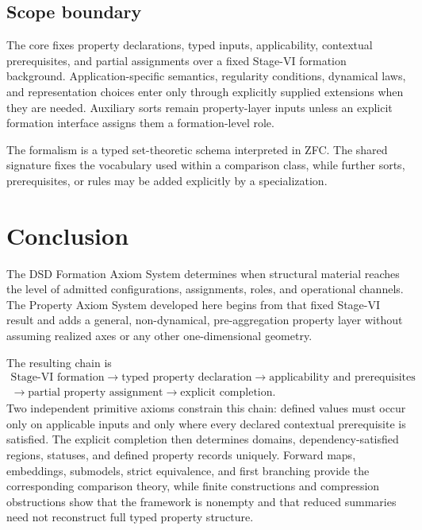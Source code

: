 \documentclass[11pt]{article}
\theoremstyle{definition}
\theoremstyle{remark}
\begin{document}
\subsection{Scope boundary}

The core fixes property declarations, typed inputs, applicability, contextual prerequisites, and partial assignments over a fixed Stage-VI formation background.
Application-specific semantics, regularity conditions, dynamical laws, and representation choices enter only through explicitly supplied extensions when they are needed.
Auxiliary sorts remain property-layer inputs unless an explicit formation interface assigns them a formation-level role.

The formalism is a typed set-theoretic schema interpreted in ZFC.
The shared signature fixes the vocabulary used within a comparison class, while further sorts, prerequisites, or rules may be added explicitly by a specialization.

\section{Conclusion}
\label{sec:conclusion}

The DSD Formation Axiom System determines when structural material reaches the level of admitted configurations, assignments, roles, and operational channels.
The Property Axiom System developed here begins from that fixed Stage-VI result and adds a general, non-dynamical, pre-aggregation property layer without assuming realized axes or any other one-dimensional geometry.

The resulting chain is
\[
\begin{gathered}
\text{Stage-VI formation}
\longrightarrow
\text{typed property declaration}
\longrightarrow
\text{applicability and prerequisites}\\
\longrightarrow
\text{partial property assignment}
\longrightarrow
\text{explicit completion}.
\end{gathered}
\]
Two independent primitive axioms constrain this chain: defined values must occur only on applicable inputs and only where every declared contextual prerequisite is satisfied.
The explicit completion then determines domains, dependency-satisfied regions, statuses, and defined property records uniquely.
Forward maps, embeddings, submodels, strict equivalence, and first branching provide the corresponding comparison theory, while finite constructions and compression obstructions show that the framework is nonempty and that reduced summaries need not reconstruct full typed property structure.
\end{document}
